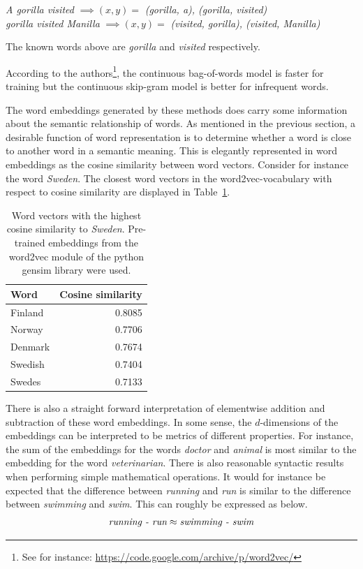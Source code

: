 \begin{center}
\textit{A gorilla visited} $\implies (x,y) = $ \textit{(gorilla, a), (gorilla, visited)} \\ \vspace{1em}
\textit{gorilla visited Manilla} $\implies (x,y) = $ \textit{(visited, gorilla), (visited, Manilla)}
\end{center}

The known words above are \textit{gorilla} and \textit{visited} respectively. 

According to the authors\footnote{See for instance: \url{https://code.google.com/archive/p/word2vec/}}, the continuous bag-of-words model is faster for training but the continuous skip-gram model is better for infrequent words. 


The word embeddings generated by these methods does carry some information about the semantic relationship of words. As mentioned in the previous section, a desirable function of word representation is to determine whether a word is close to another word in a semantic meaning. This is elegantly represented in word embeddings as the cosine similarity between word vectors. Consider for instance the word \textit{Sweden}. The closest word vectors in the word2vec-vocabulary with respect to cosine similarity are displayed in Table~\ref{tab:cossim}.

\begin{table}[h!]
    \centering
    \begin{tabular}{lr}
    \hline
        \textbf{Word} & \textbf{Cosine similarity}  \\
        \hline \hline 
        Finland & 0.8085 \\
        Norway  & 0.7706 \\
        Denmark & 0.7674 \\
        Swedish & 0.7404 \\ 
        Swedes  & 0.7133 \\
        \hline 
    \end{tabular}
    \caption{Word vectors with the highest cosine similarity to \emph{Sweden}. Pre-trained embeddings from the word2vec module of the python gensim library were used.}
\label{tab:cossim}
\end{table}

There is also a straight forward interpretation of elementwise addition and subtraction of these word embeddings. In some sense, the $d$-dimensions of the embeddings can be interpreted to be metrics of different properties. For instance, the sum of the embeddings for the words \emph{doctor} and \emph{animal} is most similar to the embedding for the word \textit{veterinarian}. There is also reasonable syntactic results when performing simple mathematical operations. It would for instance be expected that the difference between \emph{running} and \emph{run} is similar to the difference between \emph{swimming} and \emph{swim}. This can roughly be expressed as below. 
\begin{align}
    \emph{running - run} \approx  \emph{swimming - swim}
\end{align}

